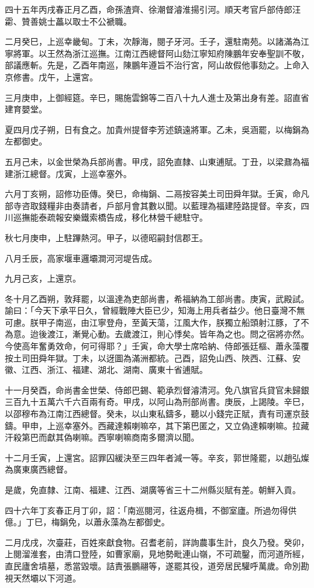\begin{pinyinscope}
四十五年丙戌春正月乙酉，命孫渣齊、徐潮督濬淮揚引河。順天考官戶部侍郎汪霦、贊善姚士藟以取士不公褫職。

二月癸巳，上巡幸畿甸。丁未，次靜海，閱子牙河。壬子，還駐南苑。以諸滿為江寧將軍。以王然為浙江巡撫。江南江西總督阿山劾江寧知府陳鵬年安奉聖訓不敬，部議應斬。先是，乙酉年南巡，陳鵬年遵旨不治行宮，阿山故假他事劾之。上命入京修書。戊午，上還宮。

三月庚申，上御經筵。辛巳，賜施雲錦等二百八十九人進士及第出身有差。詔直省建育嬰堂。

夏四月戊子朔，日有食之。加貴州提督李芳述鎮遠將軍。乙未，吳涵罷，以梅鋗為左都御史。

五月己未，以金世榮為兵部尚書。甲戌，詔免直隸、山東逋賦。丁丑，以梁鼐為福建浙江總督。戊寅，上巡幸塞外。

六月丁亥朔，詔修功臣傳。癸巳，命梅鋗、二鬲按容美土司田舜年獄。壬寅，命凡部寺咨取錢糧非由奏請者，戶部月會其數以聞。以藍理為福建陸路提督。辛亥，四川巡撫能泰疏報安樂鐵索橋告成，移化林營千總駐守。

秋七月庚申，上駐蹕熱河。甲子，以德昭嗣封信郡王。

八月壬辰，高家堰車邏壩澗河河堤告成。

九月己亥，上還京。

冬十月乙酉朔，敦拜罷，以溫達為吏部尚書，希福納為工部尚書。庚寅，武殿試。諭曰：「今天下承平日久，曾經戰陣大臣已少，知海上用兵者益少。他日臺灣不無可慮。朕甲子南巡，由江寧登舟，至黃天蕩，江風大作，朕獨立船頭射江豚，了不為意。迨後渡江，漸覺心動。去歲渡江，則心悸矣。皆年為之也。問之宿將亦然。今使高年奮勇效命，何可得耶？」壬寅，命大學士席哈納、侍郎張廷樞、蕭永藻覆按土司田舜年獄。丁未，以迓圖為滿洲都統。己酉，詔免山西、陜西、江蘇、安徽、江西、浙江、福建、湖北、湖南、廣東十省逋賦。

十一月癸酉，命尚書金世榮、侍郎巴錫、範承烈督濬清河。免八旗官兵貸官未歸銀三百九十五萬六千六百兩有奇。甲戌，以阿山為刑部尚書。庚辰，上謁陵。辛巳，以邵穆布為江南江西總督。癸未，以山東私鑄多，聽以小錢完正賦，責有司運京鼓鑄。甲申，上巡幸塞外。西藏達賴喇嘛卒，其下第巴匿之，又立偽達賴喇嘛。拉藏汗殺第巴而獻其偽喇嘛。西寧喇嘛商南多爾濟以聞。

十二月壬寅，上還宮。詔罪囚緩決至三四年者減一等。辛亥，郭世隆罷，以趙弘燦為廣東廣西總督。

是歲，免直隸、江南、福建、江西、湖廣等省三十二州縣災賦有差。朝鮮入貢。

四十六年丁亥春正月丁卯，詔：「南巡閱河，往返舟楫，不御室廬。所過勿得供億。」丁巳，梅鋗免，以蕭永藻為左都御史。

二月戊戌，次臺莊，百姓來獻食物。召耆老前，詳詢農事生計，良久乃發。癸卯，上閱溜淮套，由清口登陸，如曹家廟，見地勢毗連山嶺，不可疏鑿，而河道所經，直民廬舍墳墓，悉當毀壞。詰責張鵬翮等，遂罷其役，道旁居民驩呼萬歲。命別勘視天然壩以下河道。


\end{pinyinscope}
